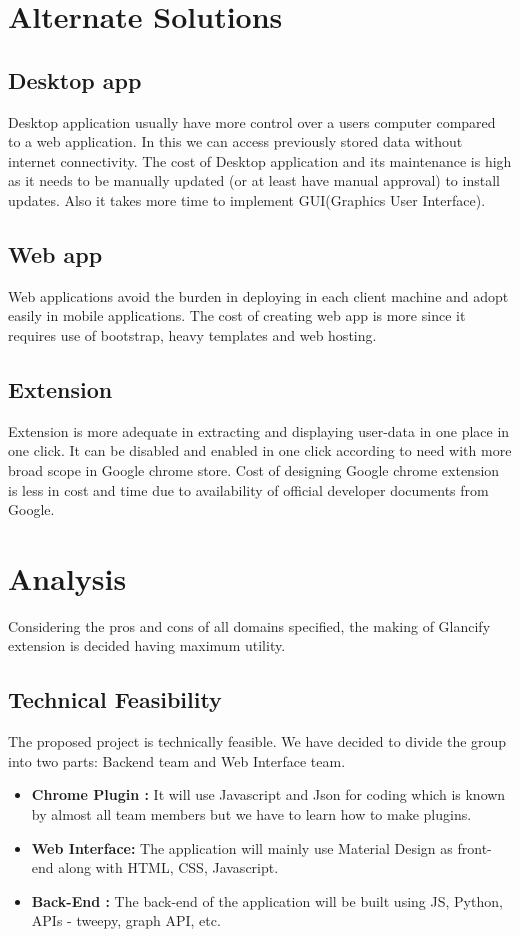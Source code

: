 \documentclass[12pt]{article}
\begin{document}
	    
	\section{Alternate Solutions}
	\subsection{Desktop app}
    Desktop application usually have more control over a users computer compared to a web application. In this we can access previously stored data without internet connectivity.
        The cost of Desktop application and its maintenance is high as it needs to be manually updated (or at least have manual approval) to install updates.
        Also it takes more time to implement GUI(Graphics User Interface).  
	\subsection{Web app}
	Web applications avoid the burden in deploying in each client machine and adopt easily in mobile applications. The cost of creating web app is more since it requires use of bootstrap, heavy templates and web hosting.
	\subsection{Extension}
	Extension is more adequate in extracting and displaying user-data in one place in one click. It can be disabled and enabled in one click according to need with more broad scope in Google chrome store.
	Cost of designing Google chrome extension is less in cost and time due to availability of official developer documents from Google.
	
	\section{Analysis}
	Considering the pros and cons of all domains specified, the making of Glancify extension is decided having maximum utility.    
	\subsection{Technical Feasibility}
	The proposed project is technically feasible. We have decided to divide the
group into two parts: Backend team and Web Interface team.\\ 
	\begin{itemize}
	    \item \textbf{Chrome Plugin :} It will use Javascript and Json for coding which is known by
almost all team members but we have to learn how to make plugins.
	\item \textbf{Web Interface:} The application will mainly use Material Design as front-end
along with HTML, CSS, Javascript.
	
	\item \textbf{Back-End :} The back-end of the application will be built using JS, Python, APIs - tweepy, graph API, etc.
    \end{itemize}
	
\end{document}
